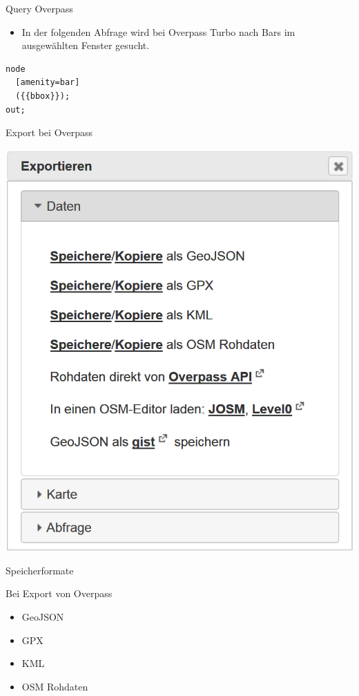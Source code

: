 \documentclass[ignorenonframetext,]{beamer}
\providecommand{\tightlist}{%
  \setlength{\itemsep}{0pt}\setlength{\parskip}{0pt}}
\begin{document}
\begin{frame}[fragile]{Query Overpass}

\begin{itemize}
\tightlist
\item
  In der folgenden Abfrage wird bei Overpass Turbo nach Bars im
  ausgewählten Fenster gesucht.
\end{itemize}

\begin{verbatim}
node
  [amenity=bar]
  ({{bbox}});
out;
\end{verbatim}

\end{frame}

\begin{frame}{Export bei Overpass}

\includegraphics{figure/OverpassExport.PNG}

\end{frame}

\begin{frame}{Speicherformate}

\begin{block}{Bei Export von Overpass}

\begin{itemize}
\tightlist
\item
  GeoJSON
\item
  GPX
\item
  KML
\item
  OSM Rohdaten
\end{itemize}

\end{block}

\end{frame}
\end{document}
